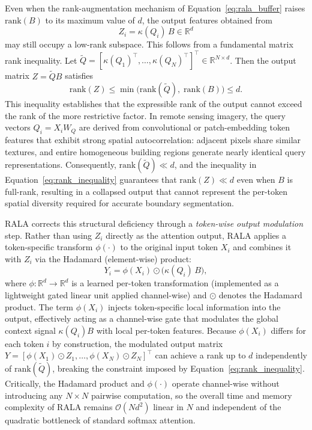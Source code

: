 Even when the rank-augmentation mechanism of Equation~\ref{eq:rala_buffer} raises $\mathrm{rank}(B)$ to its maximum value of $d$, the output features obtained from
\begin{equation}
Z_i = \kappa(Q_i)\, B \in \mathbb{R}^{d}
\label{eq:Z_pre_modulation}
\end{equation}
may still occupy a low-rank subspace. This follows from a fundamental matrix rank inequality. Let $\tilde{Q} = [\kappa(Q_1)^\top, \ldots, \kappa(Q_N)^\top]^\top \in \mathbb{R}^{N \times d}$. Then the output matrix $Z = \tilde{Q} B$ satisfies
\begin{equation}
\mathrm{rank}(Z)
    \leq \min\!\bigl(\mathrm{rank}(\tilde{Q}),\; \mathrm{rank}(B)\bigr)
    \leq d.
\label{eq:rank_inequality}
\end{equation}
This inequality establishes that the expressible rank of the output cannot exceed the rank of the more restrictive factor. In remote sensing imagery, the query vectors $Q_i = X_i W_Q$ are derived from convolutional or patch-embedding token features that exhibit strong spatial autocorrelation: adjacent pixels share similar textures, and entire homogeneous building regions generate nearly identical query representations. Consequently, $\mathrm{rank}(\tilde{Q}) \ll d$, and the inequality in Equation~\ref{eq:rank_inequality} guarantees that $\mathrm{rank}(Z) \ll d$ even when $B$ is full-rank, resulting in a collapsed output that cannot represent the per-token spatial diversity required for accurate boundary segmentation.

\ac{RALA} corrects this structural deficiency through a \emph{token-wise output modulation} step. Rather than using $Z_i$ directly as the attention output, \ac{RALA} applies a token-specific transform $\phi(\cdot)$ to the original input token $X_i$ and combines it with $Z_i$ via the Hadamard (element-wise) product:
\begin{equation}
Y_i = \phi(X_i) \odot \bigl(\kappa(Q_i)\, B\bigr),
\label{eq:Yi_modulated}
\end{equation}
where $\phi: \mathbb{R}^{d} \to \mathbb{R}^{d}$ is a learned per-token transformation (implemented as a lightweight gated linear unit applied channel-wise) and $\odot$ denotes the Hadamard product. The term $\phi(X_i)$ injects token-specific local information into the output, effectively acting as a channel-wise gate that modulates the global context signal $\kappa(Q_i) B$ with local per-token features. Because $\phi(X_i)$ differs for each token $i$ by construction, the modulated output matrix $Y = [\phi(X_1) \odot Z_1, \ldots, \phi(X_N) \odot Z_N]^\top$ can achieve a rank up to $d$ independently of $\mathrm{rank}(\tilde{Q})$, breaking the constraint imposed by Equation~\ref{eq:rank_inequality}. Critically, the Hadamard product and $\phi(\cdot)$ operate channel-wise without introducing any $N \times N$ pairwise computation, so the overall time and memory complexity of \ac{RALA} remains $\mathcal{O}(N d^2)$ linear in $N$ and independent of the quadratic bottleneck of standard softmax attention.

